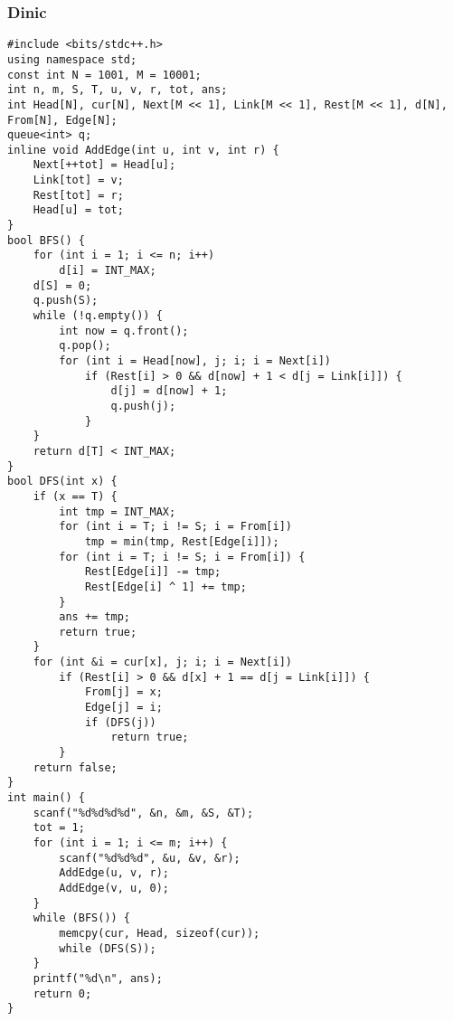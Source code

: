 \documentclass[a4paper]{article}
\begin{document}
\subsubsection{Dinic}
\begin{lstlisting}
#include <bits/stdc++.h>
using namespace std;
const int N = 1001, M = 10001;
int n, m, S, T, u, v, r, tot, ans;
int Head[N], cur[N], Next[M << 1], Link[M << 1], Rest[M << 1], d[N], From[N], Edge[N];
queue<int> q;
inline void AddEdge(int u, int v, int r) {
    Next[++tot] = Head[u];
    Link[tot] = v;
    Rest[tot] = r;
    Head[u] = tot;
}
bool BFS() {
    for (int i = 1; i <= n; i++)
        d[i] = INT_MAX;
    d[S] = 0;
    q.push(S);
    while (!q.empty()) {
        int now = q.front();
        q.pop();
        for (int i = Head[now], j; i; i = Next[i])
            if (Rest[i] > 0 && d[now] + 1 < d[j = Link[i]]) {
                d[j] = d[now] + 1;
                q.push(j);
            }
    }
    return d[T] < INT_MAX;
}
bool DFS(int x) {
    if (x == T) {
        int tmp = INT_MAX;
        for (int i = T; i != S; i = From[i])
            tmp = min(tmp, Rest[Edge[i]]);
        for (int i = T; i != S; i = From[i]) {
            Rest[Edge[i]] -= tmp;
            Rest[Edge[i] ^ 1] += tmp;
        }
        ans += tmp;
        return true;
    }
    for (int &i = cur[x], j; i; i = Next[i])
        if (Rest[i] > 0 && d[x] + 1 == d[j = Link[i]]) {
            From[j] = x;
            Edge[j] = i;
            if (DFS(j))
                return true;
        }
    return false;
}
int main() {
    scanf("%d%d%d%d", &n, &m, &S, &T);
    tot = 1;
    for (int i = 1; i <= m; i++) {
        scanf("%d%d%d", &u, &v, &r);
        AddEdge(u, v, r);
        AddEdge(v, u, 0);
    }
    while (BFS()) {
        memcpy(cur, Head, sizeof(cur));
        while (DFS(S));
    }
    printf("%d\n", ans);
    return 0;
}
\end{lstlisting}
\end{document}
